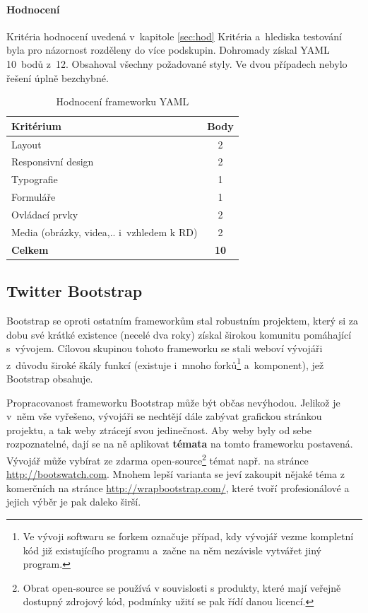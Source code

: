 \documentclass[thesis=B,czech]{FITthesis}[2012/06/26]
\begin{document}
\paragraph{Hodnocení}

Kritéria hodnocení uvedená v~kapitole \ref{sec:hod} Kritéria a~hlediska testování byla pro názornost rozděleny do více podskupin. Dohromady získal \gls{YAML} 10~bodů z~12. Obsahoval všechny požadované styly. Ve dvou případech nebylo řešení úplně bezchybné.

\begin{table}[h]\centering
 	\caption[Hodnocení YAMLu]{Hodnocení frameworku YAML}\label{tab:yaml}
 	\begin{tabular}{|l|c|}\hline
 		\textbf{Kritérium} & \textbf{Body}\tabularnewline
  		\hline \hline
		Layout & 2\tabularnewline
		\hline 
		 Responsivní design & 2\tabularnewline
		\hline 
		Typografie & 1\tabularnewline
		\hline 
		Formuláře & 1\tabularnewline
		\hline 
		Ovládací prvky & 2\tabularnewline
		\hline 
		Media  (obrázky, videa,.. i~vzhledem k RD) & 2\tabularnewline
		\hline 
		\textbf{Celkem} & \textbf{10}\tabularnewline
		\hline 
 	\end{tabular}
\end{table} 

\subsection{Twitter Bootstrap}
\label{sec:boots}

Bootstrap se oproti ostatním frameworkům stal robustním projektem, který si za dobu své krátké existence (necelé dva roky) získal širokou komunitu pomáhající s~vývojem. Cílovou skupinou tohoto frameworku se stali weboví vývojáři z~důvodu široké škály funkcí (existuje i~mnoho forků\footnote{Ve vývoji softwaru se forkem označuje případ, kdy vývojář vezme kompletní kód již existujícího programu a~začne na něm nezávisle vytvářet jiný program.} a~komponent), jež Bootstrap obsahuje. 

Propracovanost frameworku Bootstrap může být občas nevýhodou. Jelikož je v~něm vše vyřešeno, vývojáři se nechtějí dále zabývat grafickou stránkou projektu, a tak weby ztrácejí svou jedinečnost.  Aby weby byly od sebe rozpoznatelné, dají se na ně aplikovat \textbf{témata} na tomto frameworku postavená.  Vývojář může vybírat ze zdarma open-source\footnote{Obrat open-source se používá v souvislosti s produkty, které mají veřejně dostupný zdrojový kód, podmínky užití se pak řídí danou licencí.} témat např. na stránce \url{http://bootswatch.com}. Mnohem lepší varianta se jeví zakoupit nějaké téma z komerčních na stránce \url{http://wrapbootstrap.com/}, které tvoří profesionálové a jejich výběr je pak daleko širší.
\end{document}
